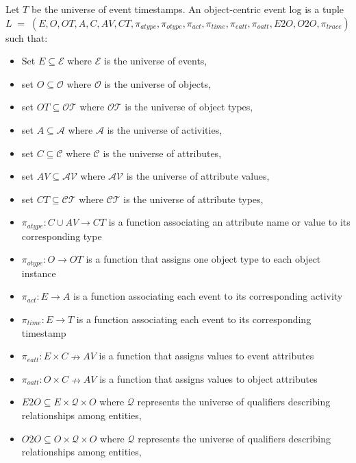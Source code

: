        \begin{definition}
        \label{def:ocel}
        Let $T$ be the universe of event timestamps.
        An object-centric event log is a tuple
        $L \; = \; (E, O, OT, A, C, AV, CT, \pi_{atype}, \pi_{otype}, \pi_{act}, \pi_{time}, \pi_{eatt}, \pi_{oatt}, E2O, O2O, \pi_{trace})$ 
        such that:
        \begin{itemize} 
        \item Set $E \subseteq \mathcal{E}$ where $\mathcal{E}$ is the universe of events,
        \item set $O \subseteq \mathcal{O}$ where $\mathcal{O}$ is the universe of objects,
        \item set $OT \subseteq \mathcal{OT}$ where $\mathcal{OT}$ is the universe of object types,
        \item set $A \subseteq \mathcal{A}$ where $\mathcal{A}$ is the universe of activities,
        \item set $C \subseteq \mathcal{C}$ where $\mathcal{C}$ is the universe of attributes,
        \item set $AV \subseteq \mathcal{AV}$ where $\mathcal{AV}$ is the universe of attribute values,
        \item set $CT \subseteq \mathcal{CT}$ where $\mathcal{CT}$ is the universe of attribute types,
        \item $\pi_{atype}: C \cup AV \to CT$ is a function associating an attribute name or value to its corresponding type
        \item $\pi_{otype}: O \to OT$ is a function that assigns one object type to each object instance
        \item $\pi_{act}: E \to A$ is a function associating each event to its corresponding activity
        \item $\pi_{time}: E \to T$ is a function associating each event to its corresponding timestamp
        \item $\pi_{eatt}: E\times C \nrightarrow AV$ is a function that assigns values to event attributes
        \item $\pi_{oatt}: O\times C \nrightarrow AV$ is a function that assigns values to object attributes
        \item $E2O \subseteq E \times \mathcal{Q} \times O$ where $\mathcal{Q}$ represents the universe of qualifiers describing relationships among entities,
        \item $O2O \subseteq O \times \mathcal{Q} \times O$ where $\mathcal{Q}$ represents the universe of qualifiers describing relationships among entities,

\end{itemize}
\end{definition}
